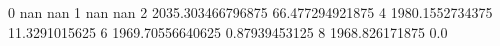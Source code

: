 0 nan nan
1 nan nan
2 2035.303466796875 66.477294921875
4 1980.1552734375 11.3291015625
6 1969.70556640625 0.87939453125
8 1968.826171875 0.0
